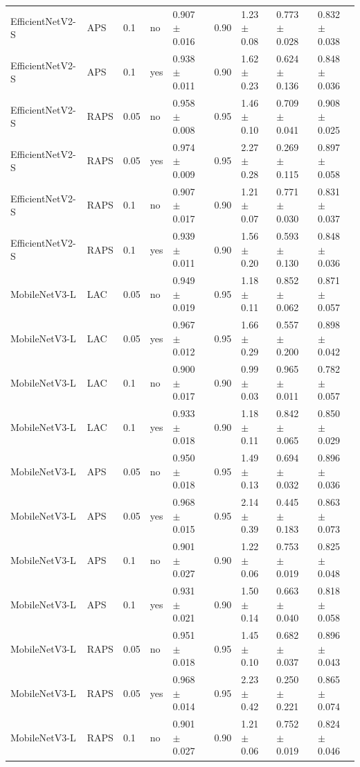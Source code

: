 \begin{table}[ht]
\begin{tabular}{lllllllll}
EfficientNetV2-S & APS & 0.1 & no & 0.907 $\pm$ 0.016 & 0.90 & 1.23 $\pm$ 0.08 & 0.773 $\pm$ 0.028 & 0.832 $\pm$ 0.038 \\
EfficientNetV2-S & APS & 0.1 & yes & 0.938 $\pm$ 0.011 & 0.90 & 1.62 $\pm$ 0.23 & 0.624 $\pm$ 0.136 & 0.848 $\pm$ 0.036 \\
EfficientNetV2-S & RAPS & 0.05 & no & 0.958 $\pm$ 0.008 & 0.95 & 1.46 $\pm$ 0.10 & 0.709 $\pm$ 0.041 & 0.908 $\pm$ 0.025 \\
EfficientNetV2-S & RAPS & 0.05 & yes & 0.974 $\pm$ 0.009 & 0.95 & 2.27 $\pm$ 0.28 & 0.269 $\pm$ 0.115 & 0.897 $\pm$ 0.058 \\
EfficientNetV2-S & RAPS & 0.1 & no & 0.907 $\pm$ 0.017 & 0.90 & 1.21 $\pm$ 0.07 & 0.771 $\pm$ 0.030 & 0.831 $\pm$ 0.037 \\
EfficientNetV2-S & RAPS & 0.1 & yes & 0.939 $\pm$ 0.011 & 0.90 & 1.56 $\pm$ 0.20 & 0.593 $\pm$ 0.130 & 0.848 $\pm$ 0.036 \\
MobileNetV3-L & LAC & 0.05 & no & 0.949 $\pm$ 0.019 & 0.95 & 1.18 $\pm$ 0.11 & 0.852 $\pm$ 0.062 & 0.871 $\pm$ 0.057 \\
MobileNetV3-L & LAC & 0.05 & yes & 0.967 $\pm$ 0.012 & 0.95 & 1.66 $\pm$ 0.29 & 0.557 $\pm$ 0.200 & 0.898 $\pm$ 0.042 \\
MobileNetV3-L & LAC & 0.1 & no & 0.900 $\pm$ 0.017 & 0.90 & 0.99 $\pm$ 0.03 & 0.965 $\pm$ 0.011 & 0.782 $\pm$ 0.057 \\
MobileNetV3-L & LAC & 0.1 & yes & 0.933 $\pm$ 0.018 & 0.90 & 1.18 $\pm$ 0.11 & 0.842 $\pm$ 0.065 & 0.850 $\pm$ 0.029 \\
MobileNetV3-L & APS & 0.05 & no & 0.950 $\pm$ 0.018 & 0.95 & 1.49 $\pm$ 0.13 & 0.694 $\pm$ 0.032 & 0.896 $\pm$ 0.036 \\
MobileNetV3-L & APS & 0.05 & yes & 0.968 $\pm$ 0.015 & 0.95 & 2.14 $\pm$ 0.39 & 0.445 $\pm$ 0.183 & 0.863 $\pm$ 0.073 \\
MobileNetV3-L & APS & 0.1 & no & 0.901 $\pm$ 0.027 & 0.90 & 1.22 $\pm$ 0.06 & 0.753 $\pm$ 0.019 & 0.825 $\pm$ 0.048 \\
MobileNetV3-L & APS & 0.1 & yes & 0.931 $\pm$ 0.021 & 0.90 & 1.50 $\pm$ 0.14 & 0.663 $\pm$ 0.040 & 0.818 $\pm$ 0.058 \\
MobileNetV3-L & RAPS & 0.05 & no & 0.951 $\pm$ 0.018 & 0.95 & 1.45 $\pm$ 0.10 & 0.682 $\pm$ 0.037 & 0.896 $\pm$ 0.043 \\
MobileNetV3-L & RAPS & 0.05 & yes & 0.968 $\pm$ 0.014 & 0.95 & 2.23 $\pm$ 0.42 & 0.250 $\pm$ 0.221 & 0.865 $\pm$ 0.074 \\
MobileNetV3-L & RAPS & 0.1 & no & 0.901 $\pm$ 0.027 & 0.90 & 1.21 $\pm$ 0.06 & 0.752 $\pm$ 0.019 & 0.824 $\pm$ 0.046 \\

\end{tabular}
\end{table}

